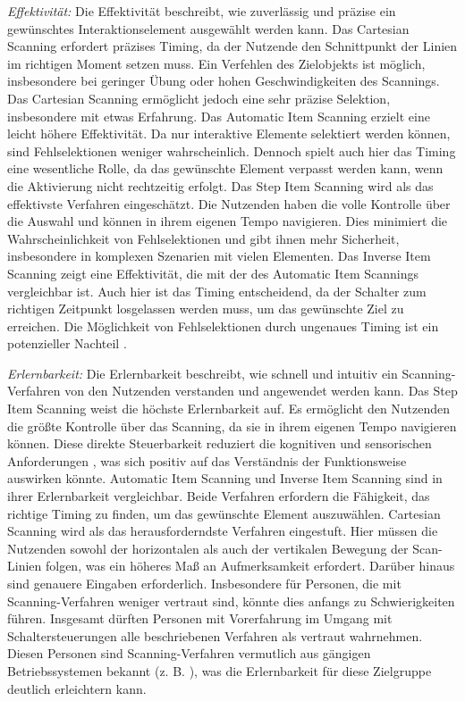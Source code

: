 \textit{Effektivität:}
Die Effektivität beschreibt, wie zuverlässig und präzise ein gewünschtes Interaktionselement ausgewählt werden kann. Das Cartesian Scanning erfordert präzises Timing, da der Nutzende den Schnittpunkt der Linien im richtigen Moment setzen muss. Ein Verfehlen des Zielobjekts ist möglich, insbesondere bei geringer Übung oder hohen Geschwindigkeiten des Scannings. Das Cartesian Scanning ermöglicht jedoch eine sehr präzise Selektion, insbesondere mit etwas Erfahrung. 
Das Automatic Item Scanning erzielt eine leicht höhere Effektivität. Da nur interaktive Elemente selektiert werden können, sind Fehlselektionen weniger wahrscheinlich. Dennoch spielt auch hier das Timing eine wesentliche Rolle, da das gewünschte Element verpasst werden kann, wenn die Aktivierung nicht rechtzeitig erfolgt. Das Step Item Scanning wird als das effektivste Verfahren eingeschätzt. Die Nutzenden haben die volle Kontrolle über die Auswahl und können in ihrem eigenen Tempo navigieren. Dies minimiert die Wahrscheinlichkeit von Fehlselektionen und gibt ihnen mehr Sicherheit, insbesondere in komplexen Szenarien mit vielen Elementen. Das Inverse Item Scanning zeigt eine Effektivität, die mit der des Automatic Item Scannings vergleichbar ist. Auch hier ist das Timing entscheidend, da der Schalter zum richtigen Zeitpunkt losgelassen werden muss, um das gewünschte Ziel zu erreichen. Die Möglichkeit von Fehlselektionen durch ungenaues Timing ist ein potenzieller Nachteil \citep{COOK2015117}.

\textit{Erlernbarkeit:}
Die Erlernbarkeit beschreibt, wie schnell und intuitiv ein Scanning-Verfahren von den Nutzenden verstanden und angewendet werden kann. Das Step Item Scanning weist die höchste Erlernbarkeit auf. Es ermöglicht den Nutzenden die größte Kontrolle über das Scanning, da sie in ihrem eigenen Tempo navigieren können. Diese direkte Steuerbarkeit reduziert die kognitiven und sensorischen Anforderungen \citep{cook_chapter_2015}, was sich positiv auf das Verständnis der Funktionsweise auswirken könnte. Automatic Item Scanning und Inverse Item Scanning sind in ihrer Erlernbarkeit vergleichbar. Beide Verfahren erfordern die Fähigkeit, das richtige Timing zu finden, um das gewünschte Element auszuwählen. Cartesian Scanning wird als das herausforderndste Verfahren eingestuft. Hier müssen die Nutzenden sowohl der horizontalen als auch der vertikalen Bewegung der Scan-Linien folgen, was ein höheres Maß an Aufmerksamkeit erfordert. Darüber hinaus sind genauere Eingaben erforderlich. Insbesondere für Personen, die mit Scanning-Verfahren weniger vertraut sind, könnte dies anfangs zu Schwierigkeiten führen.
Insgesamt dürften Personen mit Vorerfahrung im Umgang mit Schaltersteuerungen alle beschriebenen Verfahren als vertraut wahrnehmen. Diesen Personen sind Scanning-Verfahren vermutlich aus gängigen Betriebssystemen bekannt (z. B. \citep{apple_einfuhrung_2024-2, Google-Switch-Access}), was die Erlernbarkeit für diese Zielgruppe deutlich erleichtern kann.

